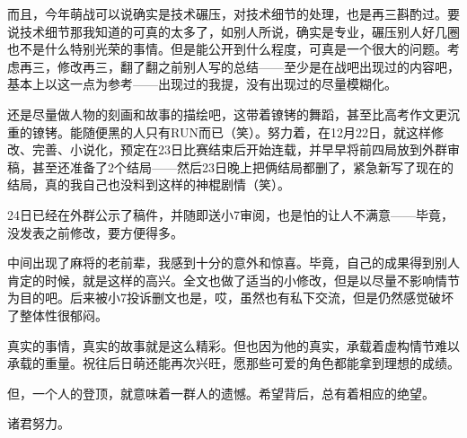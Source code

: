 而且，今年萌战可以说确实是技术碾压，对技术细节的处理，也是再三斟酌过。要说技术细节那我知道的可真的太多了，如别人所说，确实是专业，碾压别人好几圈也不是什么特别光荣的事情。但是能公开到什么程度，可真是一个很大的问题。考虑再三，修改再三，翻了翻之前别人写的总结——至少是在战吧出现过的内容吧，基本上以这一点为参考——出现过的我提，没有出现过的尽量模糊化。

还是尽量做人物的刻画和故事的描绘吧，这带着镣铐的舞蹈，甚至比高考作文更沉重的镣铐。能随便黑的人只有RUN而已（笑）。努力着，在12月22日，就这样修改、完善、小说化，预定在23日比赛结束后开始连载，并早早将前四局放到外群审稿，甚至还准备了2个结局——然后23日晚上把俩结局都删了，紧急新写了现在的结局，真的我自己也没料到这样的神棍剧情（笑）。

24日已经在外群公示了稿件，并随即送小7审阅，也是怕的让人不满意——毕竟，没发表之前修改，要方便得多。

中间出现了麻将的老前辈，我感到十分的意外和惊喜。毕竟，自己的成果得到别人肯定的时候，就是这样的高兴。全文也做了适当的小修改，但是以尽量不影响情节为目的吧。后来被小7投诉删文也是，哎，虽然也有私下交流，但是仍然感觉破坏了整体性很郁闷。

真实的事情，真实的故事就是这么精彩。但也因为他的真实，承载着虚构情节难以承载的重量。祝往后日萌还能再次兴旺，愿那些可爱的角色都能拿到理想的成绩。

但，一个人的登顶，就意味着一群人的遗憾。希望背后，总有着相应的绝望。

诸君努力。


